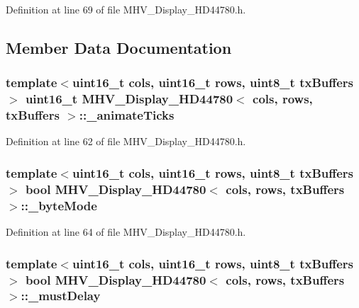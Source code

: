 Definition at line 69 of file M\-H\-V\-\_\-\-Display\-\_\-\-H\-D44780.\-h.



\subsection{Member Data Documentation}
\hypertarget{class_m_h_v___display___h_d44780_aa744690f2e7185df1210f05920fec401}{
\subsubsection[{\-\_\-animate\-Ticks}]{\setlength{\rightskip}{0pt plus 5cm}template$<$uint16\-\_\-t cols, uint16\-\_\-t rows, uint8\-\_\-t tx\-Buffers$>$ uint16\-\_\-t {\bf M\-H\-V\-\_\-\-Display\-\_\-\-H\-D44780}$<$ cols, rows, tx\-Buffers $>$\-::\-\_\-animate\-Ticks\hspace{0.3cm}{\ttfamily [protected]}}}\label{class_m_h_v___display___h_d44780_aa744690f2e7185df1210f05920fec401}


Definition at line 62 of file M\-H\-V\-\_\-\-Display\-\_\-\-H\-D44780.\-h.

\hypertarget{class_m_h_v___display___h_d44780_af41447745210bb900846ee6cd41b0818}{
\subsubsection[{\-\_\-byte\-Mode}]{\setlength{\rightskip}{0pt plus 5cm}template$<$uint16\-\_\-t cols, uint16\-\_\-t rows, uint8\-\_\-t tx\-Buffers$>$ bool {\bf M\-H\-V\-\_\-\-Display\-\_\-\-H\-D44780}$<$ cols, rows, tx\-Buffers $>$\-::\-\_\-byte\-Mode\hspace{0.3cm}{\ttfamily [protected]}}}\label{class_m_h_v___display___h_d44780_af41447745210bb900846ee6cd41b0818}


Definition at line 64 of file M\-H\-V\-\_\-\-Display\-\_\-\-H\-D44780.\-h.

\hypertarget{class_m_h_v___display___h_d44780_aa66775cef2a2fc7827427019fbbd4b7e}{
\subsubsection[{\-\_\-must\-Delay}]{\setlength{\rightskip}{0pt plus 5cm}template$<$uint16\-\_\-t cols, uint16\-\_\-t rows, uint8\-\_\-t tx\-Buffers$>$ bool {\bf M\-H\-V\-\_\-\-Display\-\_\-\-H\-D44780}$<$ cols, rows, tx\-Buffers $>$\-::\-\_\-must\-Delay\hspace{0.3cm}{\ttfamily [protected]}}}\label{class_m_h_v___display___h_d44780_aa66775cef2a2fc7827427019fbbd4b7e}


